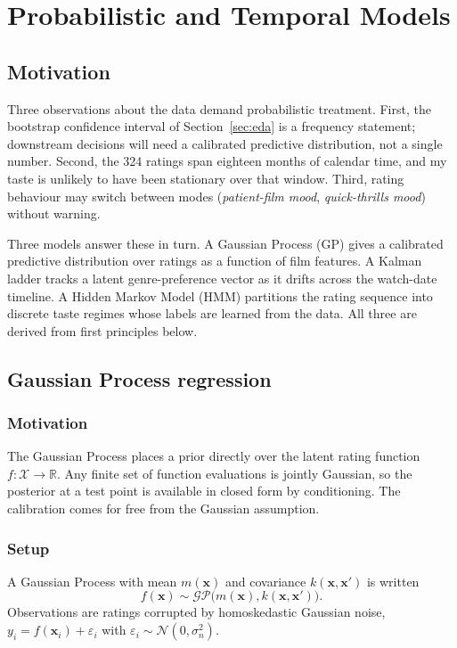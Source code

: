\documentclass{article}
\begin{document}
\section{Probabilistic and Temporal Models}
\label{sec:prob}

\subsection{Motivation}

Three observations about the data demand probabilistic treatment. First, the bootstrap confidence interval of Section~\ref{sec:eda} is a frequency statement; downstream decisions will need a calibrated predictive distribution, not a single number. Second, the 324 ratings span eighteen months of calendar time, and my taste is unlikely to have been stationary over that window. Third, rating behaviour may switch between modes (\textit{patient-film mood}, \textit{quick-thrills mood}) without warning.

Three models answer these in turn. A Gaussian Process (GP) gives a calibrated predictive distribution over ratings as a function of film features. A Kalman ladder tracks a latent genre-preference vector as it drifts across the watch-date timeline. A Hidden Markov Model (HMM) partitions the rating sequence into discrete taste regimes whose labels are learned from the data. All three are derived from first principles below.

\subsection{Gaussian Process regression}

\subsubsection*{Motivation}

The Gaussian Process places a prior directly over the latent rating function $f : \mathcal{X} \to \mathbb{R}$. Any finite set of function evaluations is jointly Gaussian, so the posterior at a test point is available in closed form by conditioning. The calibration comes for free from the Gaussian assumption.

\subsubsection*{Setup}

A Gaussian Process with mean $m(\mathbf{x})$ and covariance $k(\mathbf{x}, \mathbf{x}')$ is written
\begin{equation}
f(\mathbf{x}) \sim \mathcal{GP}\!\bigl(m(\mathbf{x}), k(\mathbf{x}, \mathbf{x}')\bigr).
\label{eq:gp-prior}
\end{equation}
Observations are ratings corrupted by homoskedastic Gaussian noise, $y_i = f(\mathbf{x}_i) + \varepsilon_i$ with $\varepsilon_i \sim \mathcal{N}(0, \sigma_n^2)$.
\end{document}
